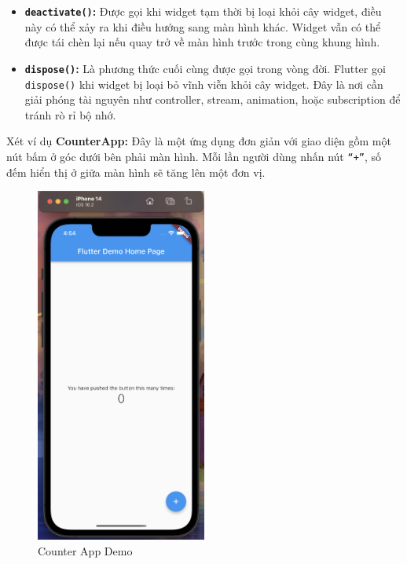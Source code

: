 \documentclass[../DoAn.tex]{subfiles}
\numberwithin{figure}{chapter}
\begin{document}
\begin{itemize}
\item \textbf{\texttt{deactivate()}:}
Được gọi khi widget tạm thời bị loại khỏi cây widget, điều này có thể xảy ra khi điều hướng sang màn hình khác. Widget vẫn có thể được tái chèn lại nếu quay trở về màn hình trước trong cùng khung hình. 

\item \textbf{\texttt{dispose()}:}
Là phương thức cuối cùng được gọi trong vòng đời. Flutter gọi \texttt{dispose()} khi widget bị loại bỏ vĩnh viễn khỏi cây widget. Đây là nơi cần giải phóng tài nguyên như controller, stream, animation, hoặc subscription để tránh rò rỉ bộ nhớ. 
\end{itemize}

Xét ví dụ \textbf{CounterApp:} Đây là một ứng dụng đơn giản với giao diện gồm một nút bấm ở góc dưới bên phải màn hình. Mỗi lần người dùng nhấn nút \texttt{“+”}, số đếm hiển thị ở giữa màn hình sẽ tăng lên một đơn vị. 
\begin{figure}[H]
    \centering
    \includegraphics[width=0.5\textwidth]{Hinhve/Chuong5/counterapp.png}
    \caption{Counter App Demo}
    \label{fig:counterapp}
\end{figure}
\end{document}
